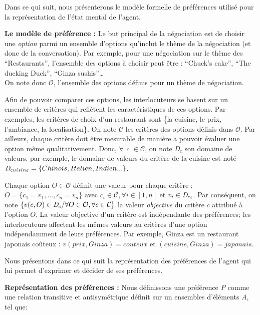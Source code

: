 \documentclass[a4paper,french]{article}
\begin{document}
 \par Dans ce qui suit, nous présenterons le modèle formelle de préférences utilisé pour la représentation de l'état mental de l'agent.
\\

\par \textbf{Le modèle de préférence :}
Le but principal de la négociation est de choisir une \emph{option} parmi un ensemble d'options qu'inclut le thème de la négociation (et donc de la conversation). Par exemple, pour une négociation sur le thème des ``Restaurants'', l'ensemble des options à choisir peut être : ``Chuck's cake'', ``The ducking Duck'', ``Ginza sushis''\ldots \\ On note donc $\mathcal{O}$, l'ensemble des options définis pour un thème de négociation. \par Afin de pouvoir  comparer ces options, les interlocuteurs se basent sur un ensemble de critères qui reflètent les caractéristiques de ces options. Par exemples, les critères de choix d'un restaurant sont \{la cuisine, le prix, l'ambiance, la localisation\}.  On note $\mathcal{C}$ les critères des options définis dans $\mathcal{O}$. Par ailleurs, chaque critère doit être mesurable de manière a pouvoir évaluer une option même qualitativement. Donc, $\forall$ \emph{c $\in\mathcal{ C}$},  on note \emph{D$_c$} son domaine de valeurs. par exemple, le domaine de valeurs du critère de la cuisine est noté $\emph{D}_{cuisine} = \{Chinois, Italien, Indien...\}$.

\par Chaque option $O\in \mathcal{O}$ définit une valeur pour chaque critère : 
$O = \{c_1=v_1,..., c_n=v_n\}$ avec $c_i \in \mathcal{C}, \forall i \in [1,n]$ et $v_i\in \emph{D}_{c_i}$. 
Par conséquent, on note $\{v(c,O) \in \emph{D}_{c} / \forall O \in \mathcal{O}, \forall c \in \mathcal{C}\}$ la valeur \emph{objective} du critère $c$ attribué à l'option $O$. La valeur objective d'un critère est indépendante des préférences; les interlocuteurs affectent les mêmes valeurs au critères d'une option indépendamment de leurs préférences. 
Par exemple, Ginza est un restaurant japonais coûteux : $v(prix, Ginza) = couteux $ et $(cuisine, Ginza) = japonais$. 

\par Nous présentons dans ce qui suit la représentation des préférences de l'agent qui lui permet d'exprimer et décider de ses préférences.
\\ \par \textbf{Représentation des préférences :}
Nous définissons une préférence \emph{P} comme une relation transitive et antisymétrique  définit sur un ensembles d'éléments \emph{A}, tel que:
\end{document}
